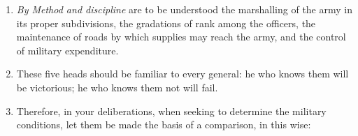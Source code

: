 \documentclass[10pt,a4paper]{book}
\begin{document}
\begin{enumerate}[leftmargin=*, label=\arabic*., resume]

\item \textit{By Method and discipline} are to be understood the marshalling of the army in its proper subdivisions, the gradations of rank among the officers, the maintenance of roads by which supplies may reach the army, and the control of military expenditure.

\item These five heads should be familiar to every general: he who knows them will be victorious; he who knows them not will fail.

\item Therefore, in your deliberations, when seeking to determine the military conditions, let them be made the basis of a comparison, in this wise:\textemdash

\end{enumerate}
\end{document}
